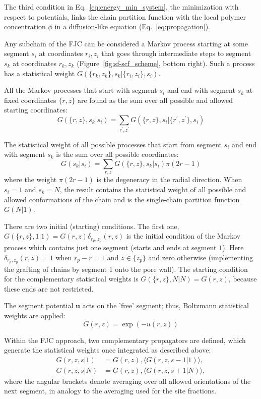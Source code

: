 \documentclass[10pt, a4paper, twocolumn]{article}
\begin{document}
The third condition in Eq.~\eqref{eq:energy_min_system}, the minimization with respect to potentials, links the chain partition function with the local polymer concentration $\phi$ in a diffusion-like equation (Eq.~\eqref{eq:propagation}).

Any subchain of the FJC can be considered a Markov process starting at some segment $s_i$ at coordinates $r_i, z_i$ that goes through intermediate steps to segment $s_k$ at coordinates $r_k, z_k$ (Figure~\ref{fig:sf-scf_scheme}, bottom right).
Such a process has a statistical weight $G(\{r_k, z_k\}, s_k | \{r_i, z_i\}, s_i)$.

All the Markov processes that start with segment $s_i$ and end with segment $s_k$ at fixed coordinates $\{r, z\}$ are found as the sum over all possible and allowed starting coordinates:
\begin{equation}
    \label{eq:sum_to_phi}
    G(\{r, z\}, s_k | s_i) = \sum_{r^{\prime}, z^{\prime}} G(\{r, z\}, s_i | \{r^{\prime}, z^{\prime}\}, s_i)
\end{equation}

The statistical weight of all possible processes that start from segment $s_i$ and end with segment $s_k$ is the sum over all possible coordinates:
\begin{equation}
    G(s_k | s_i) = \sum_{r, z} G(\{r, z\}, s_k | s_i) \pi (2r-1)
\end{equation}
where the weight $\pi (2r-1)$ is the degeneracy in the radial direction.
When $s_i=1$ and $s_k=N$, the result contains the statistical weight of all possible and allowed conformations of the chain and is the single-chain partition function $G(N|1)$.

There are two initial (starting) conditions.
The first one, $G(\{r, z\}, 1|1)=G(r,z) \delta_{r_p,z_p}(r,z) $ is the initial condition of the Markov process which contains just one segment (starts and ends at segment $1$).
Here $\delta_{r_p,z_p}(r,z)=1$ when $r_p-r=1$ and $z \in \{z_p\}$ and zero otherwise (implementing the grafting of chains by segment 1 onto the pore wall).
The starting condition for the complementary statistical weights is $G(\{r,z\},N|N)=G(r,z)$, because these ends are not restricted. 

The segment potential $\bm{u}$ acts on the 'free' segment; thus, Boltzmann statistical weights are applied:
\begin{equation}
    G(r, z) = \exp(-u(r,z))
\end{equation}

Within the FJC approach, two complementary propagators are defined, which generate the statistical weights once integrated as described above:
\begin{align}
    G(r,z,s|1) &= G(r,z),\langle G(r,z,s-1|1)\rangle, \\
    G(r,z,s|N) &= G(r,z),\langle G(r,z,s+1|N)\rangle,
\end{align}
where the angular brackets denote averaging over all allowed orientations of the next segment, in analogy to the averaging used for the site fractions.
\end{document}
